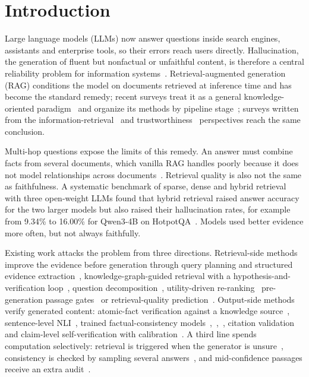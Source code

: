 \documentclass[conference]{IEEEtran}
\begin{document}
\section{Introduction}

Large language models (LLMs) now answer questions inside search engines, assistants and enterprise tools, so their errors reach users directly. Hallucination, the generation of fluent but nonfactual or unfaithful content, is therefore a central reliability problem for information systems~\cite{huang_tois}. Retrieval-augmented generation (RAG) conditions the model on documents retrieved at inference time and has become the standard remedy; recent surveys treat it as a general knowledge-oriented paradigm~\cite{cheng_tois} and organize its methods by pipeline stage~\cite{huang_csur}; surveys written from the information-retrieval~\cite{zhu_tois} and trustworthiness~\cite{ni_csur} perspectives reach the same conclusion.

Multi-hop questions expose the limits of this remedy. An answer must combine facts from several documents, which vanilla RAG handles poorly because it does not model relationships across documents~\cite{peng_tois}. Retrieval quality is also not the same as faithfulness. A systematic benchmark of sparse, dense and hybrid retrieval with three open-weight LLMs found that hybrid retrieval raised answer accuracy for the two larger models but also raised their hallucination rates, for example from 9.34\% to 16.00\% for Qwen3-4B on HotpotQA~\cite{mala_ml}. Models used better evidence more often, but not always faithfully.

Existing work attacks the problem from three directions. Retrieval-side methods improve the evidence before generation through query planning and structured evidence extraction~\cite{huang_tkdd}, knowledge-graph-guided retrieval with a hypothesis-and-verification loop~\cite{yuan_jksu}, question decomposition~\cite{linders_ai}, utility-driven re-ranking~\cite{wu_ml} pre-generation passage gates~\cite{kirubavathi_sr} or retrieval-quality prediction~\cite{sinha_tois}. Output-side methods verify generated content: atomic-fact verification against a knowledge source~\cite{min_factscore}, sentence-level NLI~\cite{laban_summac}, trained factual-consistency models~\cite{zha_alignscore},~\cite{tang_minicheck},~\cite{vectara_hhem}, citation validation~\cite{qian_vericite} and claim-level self-verification with calibration~\cite{pal_dai}. A third line spends computation selectively: retrieval is triggered when the generator is unsure~\cite{jiang_flare}, consistency is checked by sampling several answers~\cite{manakul_selfcheck}, and mid-confidence passages receive an extra audit~\cite{kirubavathi_sr}.
\end{document}
